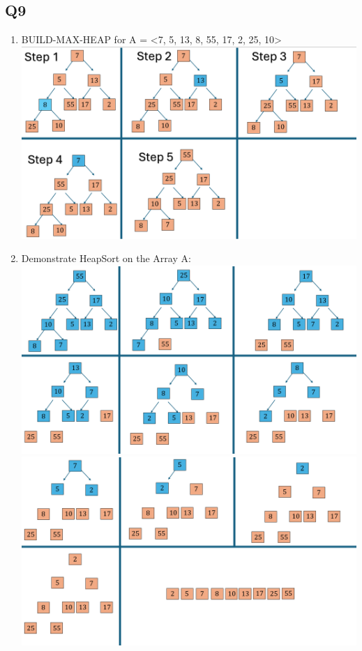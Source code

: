 \documentclass{article}
\begin{document}
\subsection*{Q9}
\begin{enumerate}[label=(\alph*)]
    \item BUILD-MAX-HEAP for A = <7, 5, 13, 8, 55, 17, 2, 25, 10>
    \subitem \includegraphics[width=1\textwidth]{heapBuild.png}
    
    \item Demonstrate HeapSort on the Array A:
    \subitem \includegraphics[width=1\textwidth]{heapSortOne.png}
    \subitem \includegraphics[width=1\textwidth]{heapSortTwo.png}
\end{enumerate}
\end{document}
